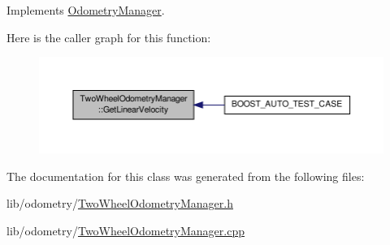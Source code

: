 Implements \hyperlink{class_odometry_manager_a75e7e965b0b224fa747fec22eb0514b7}{Odometry\-Manager}.



Here is the caller graph for this function\-:\nopagebreak
\begin{figure}[H]
\begin{center}
\leavevmode
\includegraphics[width=350pt]{class_two_wheel_odometry_manager_a0221669c64b5155424c277dca2e52c2e_icgraph}
\end{center}
\end{figure}




The documentation for this class was generated from the following files\-:\begin{DoxyCompactItemize}
\item 
lib/odometry/\hyperlink{_two_wheel_odometry_manager_8h}{Two\-Wheel\-Odometry\-Manager.\-h}\item 
lib/odometry/\hyperlink{_two_wheel_odometry_manager_8cpp}{Two\-Wheel\-Odometry\-Manager.\-cpp}\end{DoxyCompactItemize}

